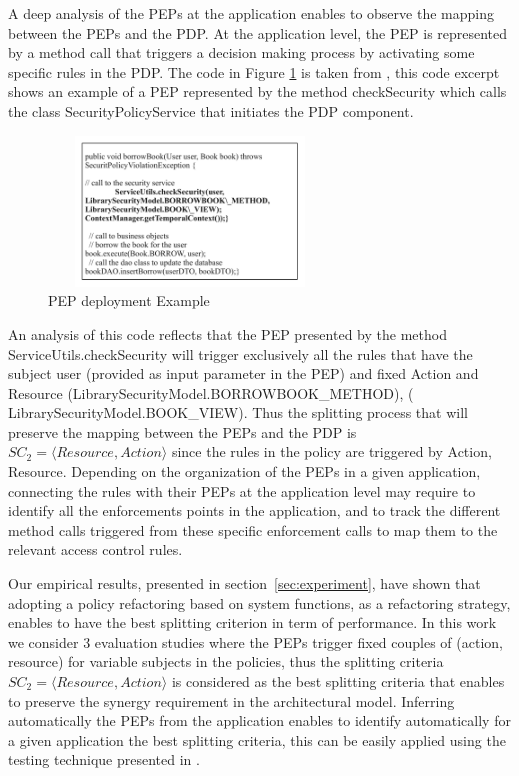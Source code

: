 A deep analysis of the PEPs at the application enables to observe the mapping between the PEPs and the PDP. At the application level, the PEP
is represented by a method call that triggers a decision making process by activating some specific rules in the PDP.
The code in Figure \ref{PEP deployment Example} is taken from \cite{legacy}, this code excerpt shows an example of a PEP represented by the method checkSecurity which calls the class 
SecurityPolicyService that initiates the PDP component.
\begin{figure}[!h]
\begin{center}
\includegraphics[width=7.5cm, height=4cm]{PEPExample}
\caption{PEP deployment Example}
\label{PEP deployment Example}
\end{center}
\end{figure}

An analysis of this code reflects that the PEP presented by the method ServiceUtils.checkSecurity will trigger exclusively all the rules 
that have the subject user (provided as input parameter in the PEP) and fixed Action and Resource (LibrarySecurityModel.BORROWBOOK\_METHOD), ( LibrarySecurityModel.BOOK\_VIEW).
Thus the splitting process that will preserve the mapping between the PEPs and the PDP is $SC_{2}=\langle Resource,Action\rangle$ since the rules in the policy are triggered 
by Action, Resource. Depending on the organization of the PEPs in a given application, connecting the rules with their PEPs at the application level may require to identify
 all the enforcements points in the application, and to track the different method calls triggered from these specific enforcement calls to map them to the relevant access control rules.

Our empirical results, presented in section~\ref{sec:experiment}, have shown that adopting a policy refactoring based on system functions, as a refactoring strategy, enables to 
have the best splitting criterion in term of performance. 
In this work we consider 3 evaluation studies where the PEPs trigger fixed couples of (action, resource) for variable subjects in the policies, thus the splitting criteria $SC_{2}=\langle Resource,Action\rangle$ is considered as 
the best splitting criteria that enables to preserve the synergy requirement in the architectural model. Inferring automatically the PEPs from the application enables to identify automatically
 for a given application the best splitting criteria, this can be easily applied using the testing technique presented in \cite{legacy}.


